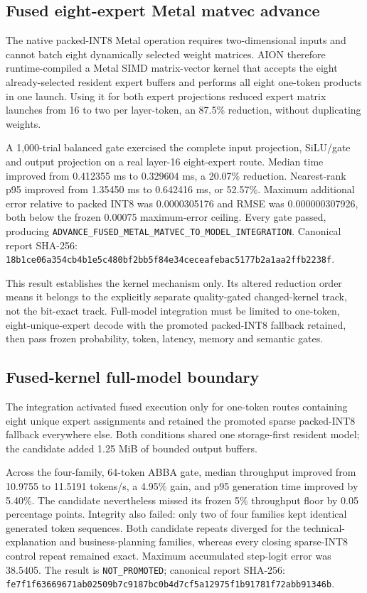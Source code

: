 \subsection{Fused eight-expert Metal matvec advance}

The native packed-INT8 Metal operation requires two-dimensional inputs and
cannot batch eight dynamically selected weight matrices. AION therefore
runtime-compiled a Metal SIMD matrix-vector kernel that accepts the eight
already-selected resident expert buffers and performs all eight one-token
products in one launch. Using it for both expert projections reduced expert
matrix launches from 16 to two per layer-token, an 87.5\% reduction, without
duplicating weights.

A 1,000-trial balanced gate exercised the complete input projection, SiLU/gate
and output projection on a real layer-16 eight-expert route. Median time improved
from 0.412355 ms to 0.329604 ms, a 20.07\% reduction. Nearest-rank p95 improved
from 1.35450 ms to 0.642416 ms, or 52.57\%. Maximum additional error relative
to packed INT8 was 0.0000305176 and RMSE was 0.000000307926, both below the
frozen 0.00075 maximum-error ceiling. Every gate passed, producing
\texttt{ADVANCE\_FUSED\_METAL\_MATVEC\_TO\_MODEL\_INTEGRATION}. Canonical
report SHA-256:
\texttt{18b1ce06a354cb4b1e5c480bf2bb5f84e34ceceafebac5177b2a1aa2ffb2238f}.

This result establishes the kernel mechanism only. Its altered reduction order
means it belongs to the explicitly separate quality-gated changed-kernel track,
not the bit-exact track. Full-model integration must be limited to one-token,
eight-unique-expert decode with the promoted packed-INT8 fallback retained, then
pass frozen probability, token, latency, memory and semantic gates.

\subsection{Fused-kernel full-model boundary}

The integration activated fused execution only for one-token routes containing
eight unique expert assignments and retained the promoted sparse packed-INT8
fallback everywhere else. Both conditions shared one storage-first resident
model; the candidate added 1.25 MiB of bounded output buffers.

Across the four-family, 64-token ABBA gate, median throughput improved from
10.9755 to 11.5191 tokens/s, a 4.95\% gain, and p95 generation time improved by
5.40\%. The candidate nevertheless missed its frozen 5\% throughput floor by
0.05 percentage points. Integrity also failed: only two of four families kept
identical generated token sequences. Both candidate repeats diverged for the
technical-explanation and business-planning families, whereas every closing
sparse-INT8 control repeat remained exact. Maximum accumulated step-logit error
was 38.5405. The result is \texttt{NOT\_PROMOTED}; canonical report SHA-256:
\texttt{fe7f1f63669671ab02509b7c9187bc0b4d7cf5a12975f1b91781f72abb91346b}.

